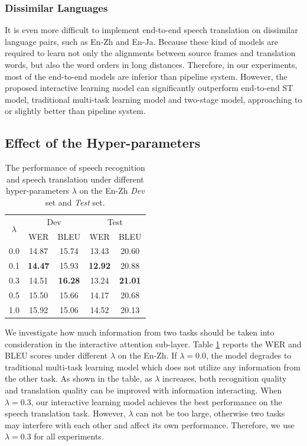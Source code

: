 \documentclass[letterpaper]{article} %
\begin{document}
\subsubsection{Dissimilar Languages}
It is even more difficult to implement end-to-end speech translation on dissimilar language pairs, such as En-Zh and En-Ja. Because these kind of models are required to learn not only the alignments between source frames and translation words, but also the word orders in long distances. Therefore, in our experiments, most of the end-to-end models are inferior than pipeline system. However, the proposed interactive learning model can significantly outperform end-to-end ST model, traditional multi-task learning model and two-stage model, approaching to or slightly better than  pipeline system.

\subsection{Effect of the Hyper-parameters}
\label{sec:lambda}
\begin{table}[t]
	\centering
	\begin{tabular}{@{}c|cc|cc@{}}
		\hline
		\multirow{2}{*}{$\lambda$} & \multicolumn{2}{c|}{Dev} & \multicolumn{2}{c}{Test} \\  
		\multicolumn{1}{c|}{}    & WER      & BLEU     & WER      & BLEU     \\ 
		\cline{1-5}
		0.0                                       & 14.87       & 15.74       & 13.43       & 20.60       \\
		0.1                                        & \textbf{14.47 }      & 15.93       & \textbf{12.92  }     & 20.88       \\
		0.3                                       &  14.51     &    \textbf{16.28 }     & 13.24       &      \textbf{21.01}  \\
		0.5                                       &  15.50        & 15.66       & 14.17       & 20.68        \\ 
		1.0                                       &   15.92         &  15.06          &     14.52        &    20.13        \\ 
		\hline
	\end{tabular}
	\caption{The performance of speech recognition and speech translation under different hyper-parameters $\lambda$ on the En-Zh \textit{Dev} set and \textit{Test} set.}
	\label{tbl:hyper-parameter}
\end{table}
We investigate how much information from two tasks should be taken into consideration in the interactive attention sub-layer. Table \ref{tbl:hyper-parameter} reports the WER and BLEU scores under different $\lambda$ on the En-Zh. If $\lambda=0.0$, the model degrades to traditional multi-task learning model which does not utilize any information from the other task. As shown in the table, as $\lambda$ increases, both recognition quality and translation quality can be improved with information interacting. When $\lambda=0.3$, our interactive learning model achieves the best performance on the speech translation task.  However, $\lambda$ can not be too large, otherwise two tasks may  interfere with each other and affect its own performance. Therefore, we use $\lambda=0.3$ for all experiments.
\end{document}
